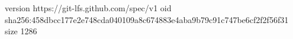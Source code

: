 version https://git-lfs.github.com/spec/v1
oid sha256:458dbcc177e2e748cda040109a8c674883e4aba9b79c91c747be6cf2f2f56f31
size 1286
